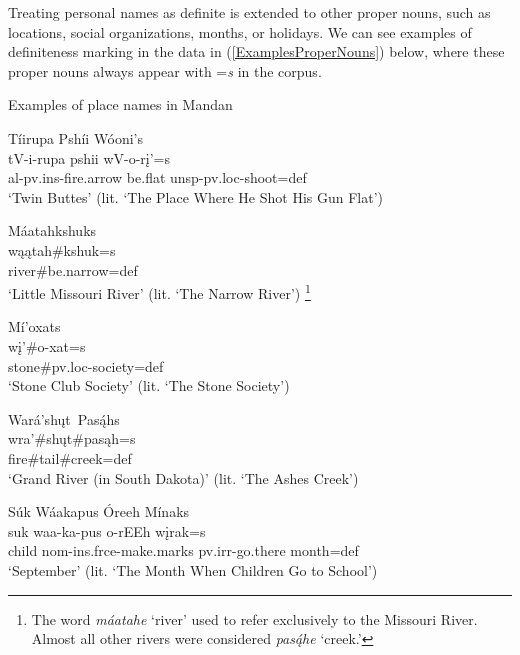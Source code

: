 Treating personal names as definite is extended to other proper nouns, such as locations, social organizations, months, or holidays. We can see examples of definiteness marking in the data in (\ref{ExamplesProperNouns}) below, where these proper nouns always appear with =\textit{s} in the corpus.

\begin{exe}

\item\label{ExamplesProperNouns} Examples of place names in Mandan

    \begin{xlist}
     
    \item \glll Tíirupa Pshíi Wóoni's\\
    tV-i-rupa pshii wV-o-rį'=s\\
    al-pv.ins-\textnormal{fire.arrow} \textnormal{be.flat} unsp-pv.loc-\textnormal{shoot}=def\\
    \glt `Twin Buttes' (lit. `The Place Where He Shot His Gun Flat') \citep[92]{hollow1970}
    
    \item \glll Máatahkshuks\\
    wąątah\#kshuk=s\\
    \textnormal{river}\#\textnormal{be.narrow}=def\\
    \glt `Little Missouri River' (lit. `The Narrow River') \citep[123]{hollow1970} \footnote{The word \textit{máatahe} `river' used to refer exclusively to the Missouri River. Almost all other rivers were considered \textit{pasą́he} `creek.'}
    
    
    \item \glll Mí'oxats\\
    wį'\#o-xat=s\\
    \textnormal{stone}\#pv.loc-\textnormal{society}=def\\
    \glt `Stone Club Society' (lit. `The Stone Society') \citep[133]{hollow1970}
    
    \item \glll Wará'shųt~Pasą́hs\\
    wra'\#shųt\#pasąh=s\\
    \textnormal{fire}\#\textnormal{tail}\#\textnormal{creek}=def\\
    \glt `Grand River (in South Dakota)' (lit. `The Ashes Creek') \citep[137]{hollow1970} 
    
    \item \glll Súk Wáakapus Óreeh Mínaks\\
    suk waa-ka-pus o-rEEh wįrak=s\\
    \textnormal{child} nom-ins.frce-\textnormal{make.marks} pv.irr-\textnormal{go.there} \textnormal{month}=def\\
    \glt `September' (lit. `The Month When Children Go to School') \citep[159]{hollow1970}
    

\end{xlist}
\end{exe}
